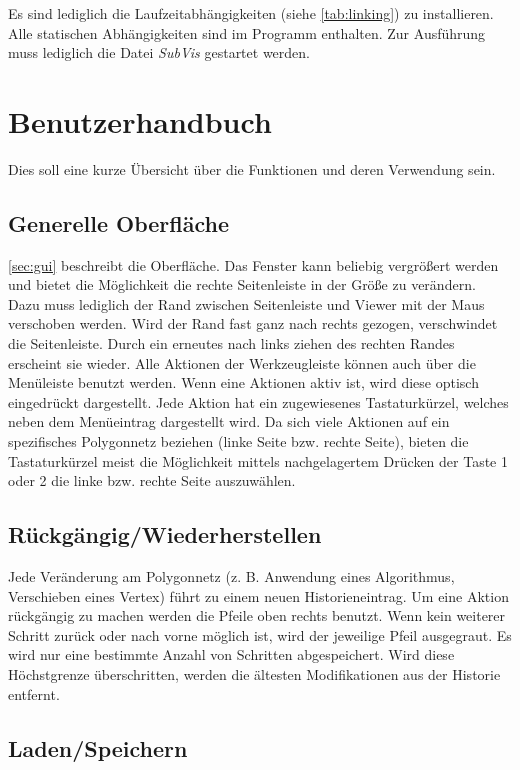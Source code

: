 Es sind lediglich die Laufzeitabhängigkeiten (siehe \autoref{tab:linking}) zu installieren. 
Alle statischen Abhängigkeiten sind im Programm enthalten.
Zur Ausführung muss lediglich die Datei \emph{SubVis} gestartet werden.

\section{Benutzerhandbuch}

Dies soll eine kurze Übersicht über die Funktionen und deren Verwendung sein.

\subsection{Generelle Oberfläche}

\autoref{sec:gui} beschreibt die Oberfläche. 
Das Fenster kann beliebig vergrößert werden und bietet die Möglichkeit die rechte Seitenleiste in der Größe zu verändern. 
Dazu muss lediglich der Rand zwischen Seitenleiste und Viewer mit der Maus verschoben werden.
Wird der Rand fast ganz nach rechts gezogen, verschwindet die Seitenleiste.
Durch ein erneutes nach links ziehen des rechten Randes erscheint sie wieder.
Alle Aktionen der Werkzeugleiste können auch über die Menüleiste benutzt werden.
Wenn eine Aktionen aktiv ist, wird diese optisch eingedrückt dargestellt.
Jede Aktion hat ein zugewiesenes Tastaturkürzel, welches neben dem Menüeintrag dargestellt wird.
Da sich viele Aktionen auf ein spezifisches Polygonnetz beziehen (linke Seite bzw. rechte Seite), bieten die Tastaturkürzel meist die Möglichkeit mittels nachgelagertem Drücken der Taste 1 oder 2 die linke bzw. rechte Seite auszuwählen.

\subsection{Rückgängig/Wiederherstellen}

Jede Veränderung am Polygonnetz (z. B. Anwendung eines Algorithmus, Verschieben eines Vertex) führt zu einem neuen Historieneintrag. 
Um eine Aktion rückgängig zu machen werden die Pfeile oben rechts benutzt.
Wenn kein weiterer Schritt zurück oder nach vorne möglich ist, wird der jeweilige Pfeil ausgegraut.
Es wird nur eine bestimmte Anzahl von Schritten abgespeichert.
Wird diese Höchstgrenze überschritten, werden die ältesten Modifikationen aus der Historie entfernt.

\subsection{Laden/Speichern}

